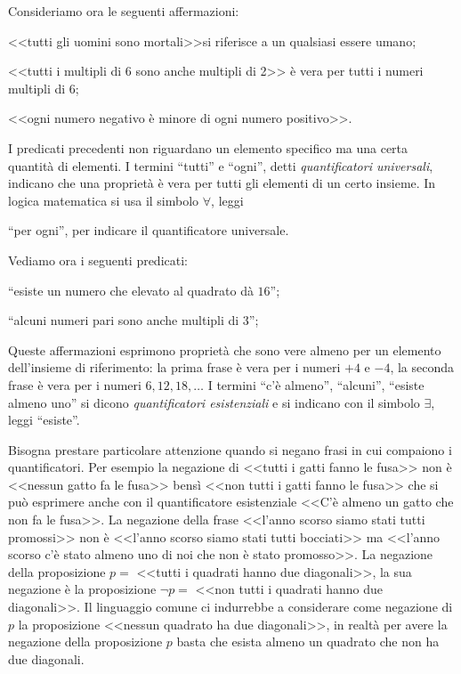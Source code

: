 Consideriamo ora le seguenti affermazioni:
\begin{itemize*}
\item <<tutti gli uomini sono mortali>>si riferisce a un qualsiasi essere umano;
\item <<tutti i multipli di 6 sono anche multipli di 2>> è vera per tutti i numeri multipli di 6;
\item <<ogni numero negativo è minore di ogni numero positivo>>.
\end{itemize*}
I predicati precedenti non riguardano un elemento specifico ma una certa quantità di elementi. I termini ``tutti'' e ``ogni'', detti \emph{quantificatori universali}, indicano che una proprietà è vera per tutti gli elementi di un certo insieme. In logica matematica si usa il simbolo ${\forall}$, leggi {``per ogni'', per indicare il quantificatore universale.

Vediamo ora i seguenti predicati:
\begin{itemize*}
\item ``esiste un numero che elevato al quadrato dà $ 16 $'';
\item ``alcuni numeri pari sono anche multipli di $ 3 $'';
\end{itemize*}
Queste affermazioni esprimono proprietà che sono vere almeno per un elemento dell'insieme di riferimento: la prima frase è vera per i numeri $ +4 $ e $ -4 $, la seconda frase è vera per i numeri $ 6, 12, 18, \ldots $
I termini ``c'è almeno'', ``alcuni'', ``esiste almeno uno'' si dicono \emph{quantificatori esistenziali} e si indicano con il simbolo ${\exists}$, leggi ``esiste''.

Bisogna prestare particolare attenzione quando si negano frasi in cui compaiono i quantificatori. Per esempio la negazione di <<tutti i gatti fanno le fusa>> non è <<nessun gatto fa le fusa>> bensì <<non tutti i gatti fanno le fusa>> che si può esprimere anche con il quantificatore esistenziale <<C'è almeno un gatto che non fa le fusa>>.
La negazione della frase <<l'anno scorso siamo stati tutti promossi>> non è <<l'anno scorso siamo stati tutti bocciati>> ma <<l'anno scorso c'è stato almeno uno di noi che non è stato promosso>>.
La negazione della proposizione $ p = $ <<tutti i quadrati hanno due diagonali>>, la sua negazione è la proposizione ${\lnot}p =$ <<non tutti i quadrati hanno due diagonali>>.
Il linguaggio comune ci indurrebbe a considerare come negazione di $ p $ la proposizione <<nessun quadrato ha due diagonali>>, in realtà per avere la negazione della proposizione $ p $ basta che esista almeno un quadrato che non ha due diagonali.

}
